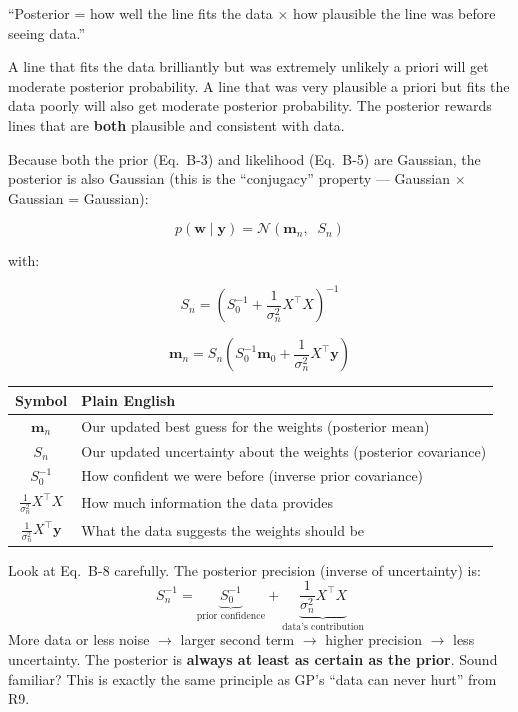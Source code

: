 \documentclass[11pt, a4paper]{article}
\newcommand{\gut}[1]{\begin{tcolorbox}[colback=lightyellow, colframe=orange!50, title=Gut feeling]#1\end{tcolorbox}}
\begin{document}
``Posterior = how well the line fits the data $\times$ how plausible the line was before seeing data.''

\gut{
A line that fits the data brilliantly but was extremely unlikely a priori will get moderate posterior probability. A line that was very plausible a priori but fits the data poorly will also get moderate posterior probability. The posterior rewards lines that are \textbf{both} plausible and consistent with data.
}

Because both the prior (Eq.~B-3) and likelihood (Eq.~B-5) are Gaussian, the posterior is also Gaussian (this is the ``conjugacy'' property --- Gaussian $\times$ Gaussian = Gaussian):

\begin{equation}
\boxed{p(\mathbf{w} \mid \mathbf{y}) = \mathcal{N}(\mathbf{m}_n, \;\; S_n)}
\tag{B-7}
\end{equation}

with:

\begin{equation}
\boxed{S_n = \left( S_0^{-1} + \frac{1}{\sigma_n^2} X^\top X \right)^{-1}}
\tag{B-8}
\end{equation}

\begin{equation}
\boxed{\mathbf{m}_n = S_n \left( S_0^{-1} \mathbf{m}_0 + \frac{1}{\sigma_n^2} X^\top \mathbf{y} \right)}
\tag{B-9}
\end{equation}

\begin{center}
\begin{tabular}{cl}
\toprule
\textbf{Symbol} & \textbf{Plain English} \\
\midrule
$\mathbf{m}_n$ & Our updated best guess for the weights (posterior mean) \\
$S_n$ & Our updated uncertainty about the weights (posterior covariance) \\
$S_0^{-1}$ & How confident we were before (inverse prior covariance) \\
$\frac{1}{\sigma_n^2} X^\top X$ & How much information the data provides \\
$\frac{1}{\sigma_n^2} X^\top \mathbf{y}$ & What the data suggests the weights should be \\
\bottomrule
\end{tabular}
\end{center}

\gut{
Look at Eq.~B-8 carefully. The posterior precision (inverse of uncertainty) is:
$$S_n^{-1} = \underbrace{S_0^{-1}}_{\text{prior confidence}} + \underbrace{\frac{1}{\sigma_n^2} X^\top X}_{\text{data's contribution}}$$
More data or less noise $\rightarrow$ larger second term $\rightarrow$ higher precision $\rightarrow$ less uncertainty. The posterior is \textbf{always at least as certain as the prior}. Sound familiar? This is exactly the same principle as GP's ``data can never hurt'' from R9.
}
\end{document}
